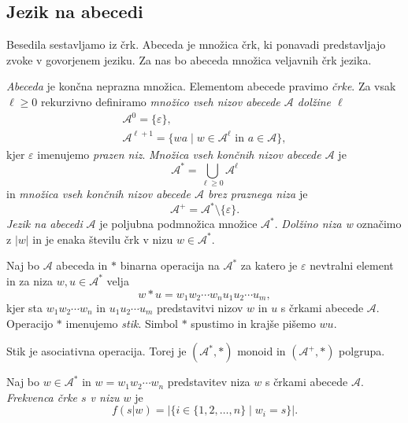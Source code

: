 \documentclass[fin1, tisk]{fmfdelo}
\providecommand{\abs}[1]{\left\lvert #1 \right\rvert}
\newcommand{\A}{\mathcal{A}}
\theoremstyle{definition}
\begin{document}
\subsection{Jezik na abecedi}
Besedila sestavljamo iz črk. Abeceda je množica črk, ki ponavadi predstavljajo zvoke v
govorjenem jeziku. Za nas bo abeceda množica veljavnih črk jezika.

\begin{definicija}
    \emph{Abeceda} je končna neprazna množica. Elementom abecede pravimo \emph{črke}.
    Za vsak $\ell \geq 0$ rekurzivno definiramo \emph{množico vseh nizov abecede $\A$ dolžine 
    $\ell$}
    \begin{gather*}
        \A^0 = \{ \varepsilon \}, \\
        \A^{\ell+1} = \{ wa \mid w \in \A^{\ell} \text{ in } a \in \A \},
    \end{gather*}
    kjer $\varepsilon$ imenujemo \emph{prazen niz}.
    \emph{Množica vseh končnih nizov abecede $\A$} je
    \[
        \A^* = \bigcup_{\ell \geq 0} \A^\ell
    \]
    in \emph{množica vseh končnih nizov abecede $\A$ brez praznega niza} je
    \[
        \A^+ = \A^* \setminus \{ \varepsilon \}.
    \]
    \emph{Jezik na abecedi} $\A$ je poljubna podmnožica množice $\A^*$. 
    \emph{Dolžino niza w} označimo z $\abs{w}$ in je enaka številu črk v nizu $ w \in \A^* $.
\end{definicija}

\begin{definicija}
    Naj bo $\A$ abeceda in $*$ binarna operacija na $\A^*$ za katero je $\varepsilon$ 
    nevtralni element in za niza $ w, u \in \A^* $ velja
    \[
        w*u = w_1w_2 \cdots w_nu_1u_2 \cdots u_m,
    \]
    kjer sta $w_1w_2 \cdots w_n$ in $u_1u_2 \cdots u_m$ predstavitvi nizov $w$ in $u$ s črkami
    abecede $\A$. Operacijo $*$ imenujemo \emph{stik}. Simbol $*$ spustimo in 
    krajše pišemo $wu$.
\end{definicija}

\begin{opomba}
    Stik je asociativna operacija. Torej je $(\A^*, *)$ monoid in $(\A^+, *)$ polgrupa.
\end{opomba}

\begin{definicija}
    Naj bo $w \in \A^*$ in $w = w_1w_2 \cdots w_n$ predstavitev niza $w$ s črkami abecede 
    $\A$. \emph{Frekvenca črke $s$ v nizu $w$} je
    \[
        f(s|w) = \abs{ \bigl\{ i \in \{1, 2, \ldots, n\} \mid w_i = s \bigr\} }.
    \]
\end{definicija}
\end{document}
